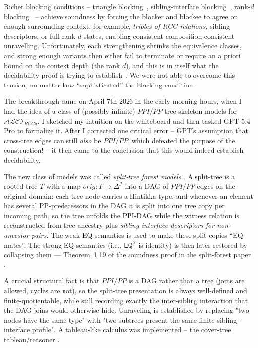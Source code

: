 \documentclass[
]{ceurart}
\theoremstyle{definition}
\newcommand{\ALCIRCC}[1]{\ensuremath{\mathcal{ALCI}_{\mathit{RCC#1}}}}
\newcommand{\EQ}{\ensuremath{\mathsf{EQ}}}
\begin{document}
Richer blocking conditions -- triangle
blocking~\cite{TriangleBlocking,ResponseGPTBlocking},
sibling-interface blocking~\cite{SiblingCompleted}, rank-$d$
blocking~\cite{SiblingCompleted,CompletenessExtraction} -- achieve
soundness by forcing the blocker and blockee to agree on enough
surrounding context, for example, \emph{triples of RCC relations,}
sibling descriptors, or full rank-$d$ states, enabling consistent
composition-consistent unravelling. Unfortunately, each strengthening
shrinks the equivalence classes, and strong enough variants then
either fail to terminate or require an a priori bound on the context
depth (the rank $d$), and this is in itself what the decidability
proof is trying to
establish~\cite{FWProof,PatchworkAugmentation,TypedPatchworkCounterexample}.
We were not able to overcome this tension, no matter how
``sophisticated'' the blocking
condition~\cite{ALCIRCC5Outdated,StatusAfterFW}.

The breakthrough came on April 7th 2026 in the early morning hours,
when I had the idea of a class of (possibly infinite)
$\mathit{PPI}/\mathit{PP}$ tree skeleton models for \ALCIRCC{5}.  I
sketched my intuition on the whiteboard \cite{WesselWhiteboard2026}
and then tasked GPT 5.4 Pro to formalize it. After I corrected one
critical error -- GPT's assumption that cross-tree edges can still
\emph{also} be $\mathit{PPI}/\mathit{PP}$, which defeated the purpose
of the construction! -- it then came to the conclusion that this would
indeed establish decidability.

The new class of models was called \emph{split-tree forest models}
\cite{SiblingCompleted, CompletenessExtraction}. A split-tree is a
rooted tree $T$ with a map $\mathit{orig}: T \to \Delta^{\mathcal{I}}$
into a DAG of $\mathit{PPI}/\mathit{PP}$-edges on the original domain: each tree node
carries a Hintikka type, and whenever an element has several
PP-predecessors in the DAG it is split into one tree copy per incoming
path, so the tree unfolds the PPI-DAG while the witness relation is
reconstructed from tree ancestry plus \emph{sibling-interface
descriptors for non-ancestor pairs.}  The weak-EQ semantics
\cite{Wessel2003} is used to make these split copies ``EQ-mates''. The
strong EQ semantics (i.e., $\EQ^{\mathcal{I}}$ is identity) is then
later restored by collapsing them — Theorem~1.19 of the soundness
proof in the split-forest paper \cite{SiblingCompleted,
  CompletenessExtraction}.

A crucial structural fact is that $\mathit{PPI}/\mathit{PP}$ is a DAG rather than a tree
(joins are allowed, cycles are not), so the split-tree presentation is
always well-defined and finite-quotientable, while still recording
exactly the inter-sibling interaction that the DAG joins would
otherwise hide. Unraveling is established by replacing "two nodes have
the same type" with "two subtrees present the same finite
sibling-interface profile". A tableau-like calculus was implemented --
the cover-tree tableau/reasoner \cite{CoverTree, CoverTreeImpl}.
\end{document}
